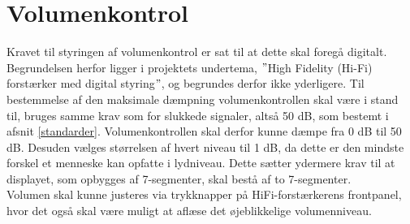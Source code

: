 \section{Volumenkontrol}
\label{valg_volumenkontrol}
Kravet til styringen af volumenkontrol er sat til at dette skal foregå digitalt. Begrundelsen herfor ligger i projektets undertema, $"$High Fidelity (Hi-Fi) forstærker med digital styring$"$, og begrundes derfor ikke yderligere. Til bestemmelse af den maksimale dæmpning volumenkontrollen skal være i stand til, bruges samme krav som for slukkede signaler, altså 50 dB, som bestemt i afsnit \ref{standarder}. Volumenkontrollen skal derfor kunne dæmpe fra  0 dB til 50 dB. Desuden vælges størrelsen af hvert niveau til 1 dB, da dette er den mindste forskel et menneske kan opfatte i lydniveau. Dette sætter ydermere krav til at displayet, som opbygges af 7-segmenter, skal bestå af to 7-segmenter.\\
Volumen skal kunne justeres via trykknapper på HiFi-forstærkerens frontpanel, hvor det også skal være muligt at aflæse det øjeblikkelige volumenniveau.  
